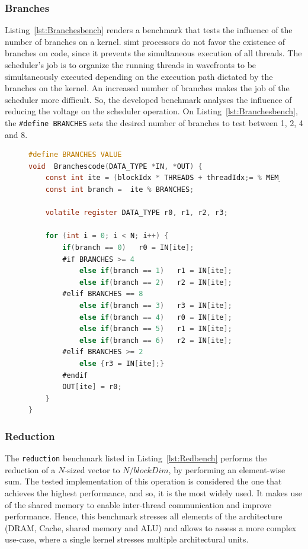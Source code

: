 \subsubsection{Branches}

Listing~\ref{lst:Branchesbench} renders a benchmark that tests the influence of the number of branches on a kernel. \acrshort{simt} processors do not favor the existence of branches on code, since it prevents the simultaneous execution of all threads. 
The scheduler's job is to organize the running threads in wavefronts to be simultaneously executed depending on the execution path dictated by the branches on the kernel. An increased number of branches makes the job of the scheduler more difficult. So, the developed benchmark analyses the influence of reducing the voltage on the scheduler operation. On Listing~\ref{lst:Branchesbench}, the \texttt{\#define BRANCHES} sets the desired number of branches to test between 1, 2, 4 and 8.

\begin{figure}[h]
\begin{lstlisting}[language=C, caption=Branches Benchmark Code, label=lst:Branchesbench, basicstyle=\footnotesize\ttfamily,abovecaptionskip=0pt, captionpos=b]
#define BRANCHES VALUE
void  Branchescode(DATA_TYPE *IN, *OUT) {
    const int ite = (blockIdx * THREADS + threadIdx;= % MEM_BLOCK;
    const int branch =  ite % BRANCHES;
    
    volatile register DATA_TYPE r0, r1, r2, r3;
    
    for (int i = 0; i < N; i++) {
        if(branch == 0)   r0 = IN[ite];
        #if BRANCHES >= 4
            else if(branch == 1)   r1 = IN[ite];
            else if(branch == 2)   r2 = IN[ite];
        #elif BRANCHES == 8
            else if(branch == 3)   r3 = IN[ite];
            else if(branch == 4)   r0 = IN[ite];
            else if(branch == 5)   r1 = IN[ite];
            else if(branch == 6)   r2 = IN[ite];
        #elif BRANCHES >= 2
            else {r3 = IN[ite];}
        #endif
        OUT[ite] = r0;
    }
}
\end{lstlisting}
\end{figure}

\subsubsection{Reduction}

The \texttt{reduction} benchmark listed in Listing~\ref{lst:Redbench} performs the reduction of a $N$-sized vector to $N/blockDim$, by performing an element-wise sum. The tested implementation of this operation is considered the one that achieves the highest performance, and so, it is the most widely used. It makes use of the shared memory to enable inter-thread communication and improve performance. Hence, this benchmark stresses all elements of the architecture (DRAM, Cache, shared memory and ALU) and allows to assess a more complex use-case, where a single kernel stresses multiple architectural units.

